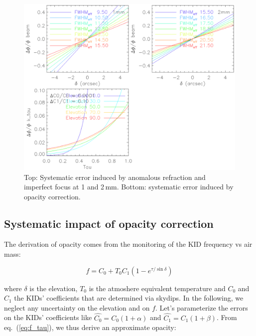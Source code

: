 \begin{figure}[hhh]
\begin{center}
\includegraphics[clip, angle=0, scale =0.8]{Figures/error_budget.eps}
\caption{Top: Systematic error induced by anomalous refraction and imperfect
  focus at 1 and 2\,mm. Bottom: systematic error induced by opacity correction.}
\label{fig:error_budget}
\end{center}
\end{figure}

\subsection{Systematic impact of opacity correction}
\label{se:k_tau}

The derivation of opacity comes from the monitoring of the KID frequency vs air
mass:

\begin{equation}
f = C_0 + T_0C_1(1-e^{\tau/\sin\delta})
\label{eq:f_tau}
\end{equation}

where $\delta$ is the elevation, $T_0$ is the atmoshere equivalent temperature
and $C_0$ and $C_1$ the KIDs' coefficients that are determined via skydips. In
the following, we neglect any uncertainty on the elevation and on $f$. Let's
parameterize the errors on the KIDs' coefficients like $\hat{C_0} =
C_0(1+\alpha)$ and $\hat{C_1} = C_1(1+\beta)$. From eq.~(\ref{eq:f_tau}), we
thus derive an approximate opacity:

